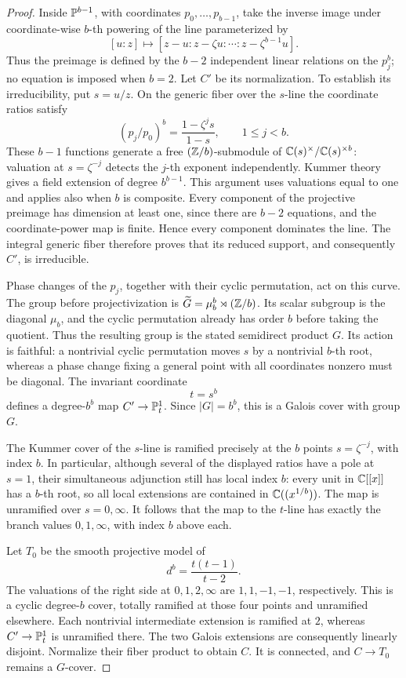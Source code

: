 \begin{proof}
Inside \(\mathbb P^{b-1}\), with coordinates \(p_0,\ldots,p_{b-1}\), take
the inverse image under coordinate-wise \(b\)-th powering of the line
parameterized by
\[
 [u:z]\longmapsto[z-u:z-\zeta u:\cdots:z-\zeta^{b-1}u].
\]
Thus the preimage is defined by the \(b-2\) independent linear
relations on the \(p_j^b\); no equation is imposed when \(b=2\).
Let \(C'\) be its normalization.  To establish its irreducibility,
put \(s=u/z\).  On the generic fiber over the \(s\)-line the coordinate
ratios satisfy
\[
 (p_j/p_0)^b=\frac{1-\zeta^j s}{1-s},\qquad 1\le j<b.
\]
These \(b-1\) functions generate a free
\((\mathbb Z/b)\)-submodule of
\(\mathbb C(s)^\times/\mathbb C(s)^{\times b}\): valuation at
\(s=\zeta^{-j}\) detects the \(j\)-th exponent independently.
Kummer theory gives a field extension of degree \(b^{b-1}\).
This argument uses valuations equal to one and applies also when
\(b\) is composite.  Every component of the projective preimage
has dimension at least one, since there are \(b-2\) equations, and
the coordinate-power map is finite.  Hence every component dominates
the line.  The integral generic fiber therefore proves that its
reduced support, and consequently \(C'\), is irreducible.

Phase changes of the \(p_j\), together with their cyclic permutation,
act on this curve.  The group before projectivization is
\(\widetilde G=\mu_b^b\rtimes(\mathbb Z/b)\).  Its scalar subgroup is the
diagonal \(\mu_b\), and the cyclic permutation already has order
\(b\) before taking the quotient.  Thus the resulting group is
the stated semidirect product \(G\).  Its action is faithful:
a nontrivial cyclic permutation moves \(s\) by a nontrivial
\(b\)-th root, whereas a phase change fixing a general point with
all coordinates nonzero must be diagonal.
The invariant coordinate
\[
 t=s^b
\]
defines a degree-\(b^b\) map \(C'\to\mathbb P^1_t\).  Since \(|G|=b^b\),
this is a Galois cover with group \(G\).

The Kummer cover of the \(s\)-line is ramified precisely at the
\(b\) points \(s=\zeta^{-j}\), with index \(b\).  In particular,
although several of the displayed ratios have a pole at \(s=1\),
their simultaneous adjunction still has local index \(b\): every
unit in \(\mathbb C[[x]]\) has a \(b\)-th root, so all local extensions
are contained in \(\mathbb C((x^{1/b}))\).
The map is unramified over \(s=0,\infty\).
It follows that the map to the \(t\)-line has exactly the branch
values \(0,1,\infty\), with index \(b\) above each.

Let \(T_0\) be the smooth projective model of
\begin{equation}\label{eq:auxiliary-cyclic-cover}
 d^b=\frac{t(t-1)}{t-2}.
\end{equation}
The valuations of the right side at \(0,1,2,\infty\) are
\(1,1,-1,-1\), respectively.  This is a cyclic degree-\(b\)
cover, totally ramified at those four points and unramified
elsewhere.  Each nontrivial intermediate extension is ramified
at \(2\), whereas \(C'\to\mathbb P^1_t\) is unramified there.
The two Galois extensions are consequently linearly disjoint.
Normalize their fiber product to obtain \(C\).
It is connected, and \(C\to T_0\) remains a \(G\)-cover.


\end{proof}
